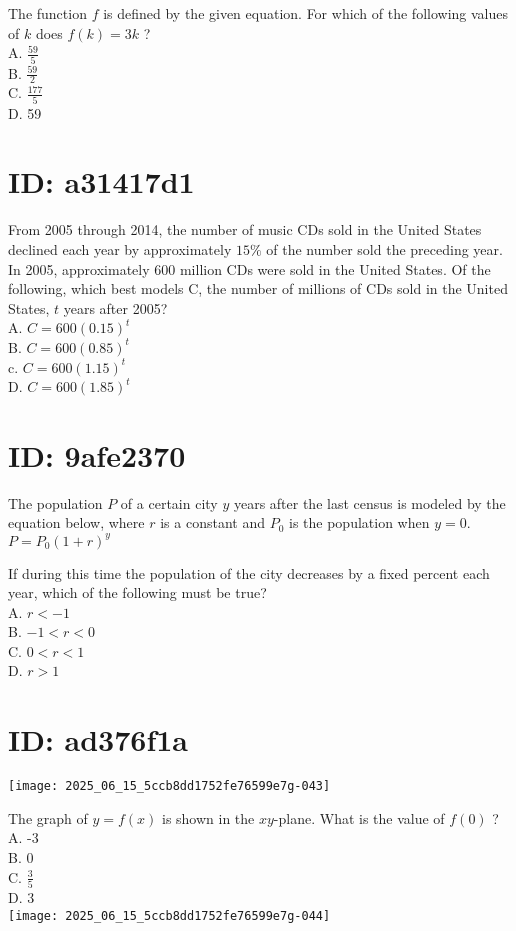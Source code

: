 The function $f$ is defined by the given equation. For which of the following values of $k$ does $f(k)=3 k$ ?\\
A. $\frac{59}{5}$\\
B. $\frac{59}{2}$\\
C. $\frac{177}{5}$\\
D. 59

\section*{ID: a31417d1}
From 2005 through 2014, the number of music CDs sold in the United States declined each year by approximately $15 \%$ of the number sold the preceding year. In 2005, approximately 600 million CDs were sold in the United States. Of the following, which best models C, the number of millions of CDs sold in the United States, $t$ years after 2005?\\
A. $C=600(0.15)^{t}$\\
B. $C=600(0.85)^{t}$\\
c. $C=600(1.15)^{t}$\\
D. $C=600(1.85)^{t}$

\section*{ID: 9afe2370}
The population $P$ of a certain city $y$ years after the last census is modeled by the equation below, where $r$ is a constant and $P_{0}$ is the population when $y=0$.\\
$P=P_{0}(1+r)^{y}$

If during this time the population of the city decreases by a fixed percent each year, which of the following must be true?\\
A. $r<-1$\\
B. $-1<r<0$\\
C. $0<r<1$\\
D. $r>1$

\section*{ID: ad376f1a}
\begin{center}
\texttt{[image: 2025\_06\_15\_5ccb8dd1752fe76599e7g-043]}
\end{center}

The graph of $y=f(x)$ is shown in the $x y$-plane. What is the value of $f(0)$ ?\\
A. -3\\
B. 0\\
C. $\frac{3}{5}$\\
D. 3\\
\texttt{[image: 2025\_06\_15\_5ccb8dd1752fe76599e7g-044]}

